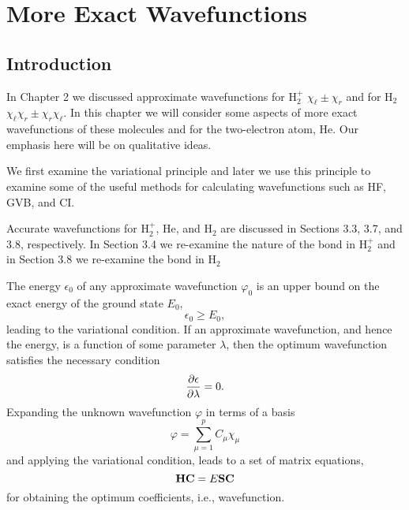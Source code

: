 \chapter{More Exact Wavefunctions}

\section{Introduction}

In Chapter 2 we discussed approximate wavefunctions for H$^+_2$
$\chi_{\ell} \pm \chi_r$ and for H$_2$ $\chi_{\ell} \chi_r \pm \chi_r
\chi_{\ell}$.  In this chapter we will consider some aspects of more
exact wavefunctions of these molecules and for the two-electron atom,
He. Our emphasis here will be on qualitative ideas.

We first examine the variational principle and later we use this principle to
examine some of the useful methods for calculating wavefunctions such as 
HF, GVB, and CI.

Accurate wavefunctions for H$^+_2$, He, and H$_2$ are discussed in Sections 
3.3, 3.7, and 3.8, respectively. In Section 3.4 we re-examine the nature of 
the bond in H$^+_2$ and in Section 3.8 we re-examine the bond in H$_2$

The energy $\epsilon_0$  of any approximate wavefunction $\varphi_0$ is an 
upper bound on the exact energy of the ground state $E_0$,
\begin{equation}
\epsilon_0 \geq E_0 ,
\end{equation}
leading to the variational condition. If an approximate wavefunction, and 
hence the energy, is a function of some parameter $\lambda$, then the optimum 
wavefunction satisfies the necessary condition
\begin{equation}
{\partial \epsilon \over \partial \lambda} = 0 .
\end{equation}
Expanding the unknown wavefunction $\varphi$ in terms of a basis
\begin{equation}
\varphi = \sum^{p}_{\mu = 1} C_{\mu} \chi_{\mu}
\end{equation}
and applying the variational condition, leads to a set of matrix equations,
\begin{equation}
{\bf H} {\bf C} = E {\bf S} {\bf C}
\end{equation}
for obtaining the optimum coefficients, i.e., wavefunction.

